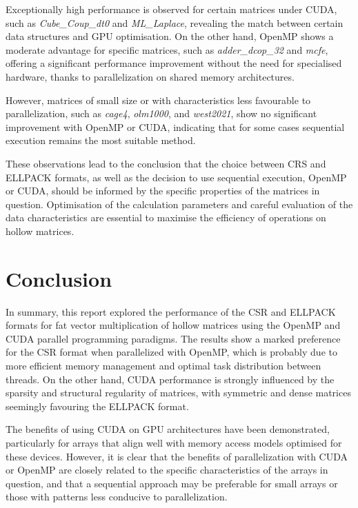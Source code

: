\documentclass[12pt,oneside]{book} %
\begin{document}
Exceptionally high performance is observed for certain matrices under CUDA,
such as \textit{Cube\_Coup\_dt0} and \textit{ML\_Laplace}, revealing the match
between certain data structures and GPU optimisation. On the other hand, OpenMP
shows a moderate advantage for specific matrices, such as
\textit{adder\_dcop\_32} and \textit{mcfe}, offering a significant performance
improvement without the need for specialised hardware, thanks to
parallelization on shared memory architectures.

However, matrices of small size or with characteristics less favourable to
parallelization, such as \textit{cage4}, \textit{olm1000}, and
\textit{west2021}, show no significant improvement with OpenMP or CUDA,
indicating that for some cases sequential execution remains the most suitable
method.

These observations lead to the conclusion that the choice between CRS and
ELLPACK formats, as well as the decision to use sequential execution, OpenMP or
CUDA, should be informed by the specific properties of the matrices in
question. Optimisation of the calculation parameters and careful evaluation of
the data characteristics are essential to maximise the efficiency of operations
on hollow matrices.

\chapter{Conclusion}

In summary, this report explored the performance of the CSR and ELLPACK formats
for fat vector multiplication of hollow matrices using the OpenMP and CUDA
parallel programming paradigms. The results show a marked preference for the
CSR format when parallelized with OpenMP, which is probably due to more
efficient memory management and optimal task distribution between threads. On
the other hand, CUDA performance is strongly influenced by the sparsity and
structural regularity of matrices, with symmetric and dense matrices seemingly
favouring the ELLPACK format.

The benefits of using CUDA on GPU architectures have been demonstrated,
particularly for arrays that align well with memory access models optimised for
these devices. However, it is clear that the benefits of parallelization with
CUDA or OpenMP are closely related to the specific characteristics of the
arrays in question, and that a sequential approach may be preferable for small
arrays or those with patterns less conducive to parallelization.
\end{document}
